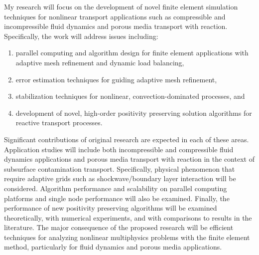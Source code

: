 \documentclass[12pt,pdftex]{article}
\begin{document}
My research will focus on the development of novel finite element
simulation techniques for nonlinear transport applications such as
compressible and incompressible fluid dynamics and porous media
transport with reaction.  Specifically, the work will address issues
including:
\begin{enumerate}
  \item parallel computing and algorithm design for finite element
    applications with adaptive mesh refinement and dynamic load
    balancing,
  \item error estimation techniques for guiding adaptive mesh
    refinement,
  \item stabilization techniques for nonlinear, convection-dominated
    processes, and
  \item development of novel, high-order positivity preserving
    solution algorithms for reactive transport processes.
\end{enumerate}
Significant contributions of original research
are expected in each of these areas.  Application studies will include
both incompressible and compressible fluid dynamics applications and
porous media transport with reaction in the context of subsurface
contamination transport.  Specifically, physical phenomenon that
require adaptive grids such as shockwave/boundary layer interaction
will be considered. Algorithm performance and scalability on parallel
computing platforms and single node performance will also be examined.
Finally, the performance of new positivity preserving algorithms will
be examined theoretically, with numerical experiments, and with
comparisons to results in the literature.  The major consequence of
the proposed research will be efficient techniques for analyzing
nonlinear multiphysics problems with the finite element method,
particularly for fluid dynamics and porous media applications.
\end{document}
